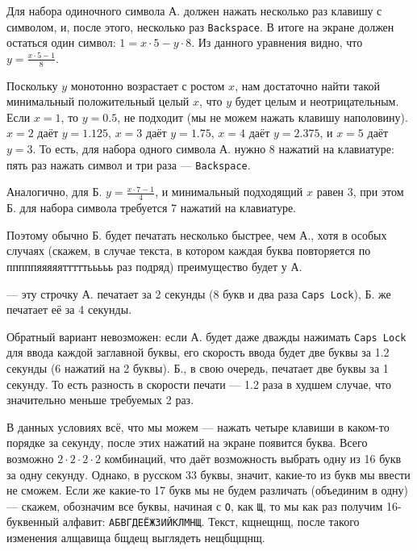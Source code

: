 \begin{itemize}
\itA Для набора одиночного символа А. должен нажать несколько раз клавишу с символом, 
и, после этого, несколько раз \verb!Backspace!. В итоге на экране должен остаться один
символ: $1 = x \cdot 5 - y \cdot 8$. Из данного уравнения видно, что
$y = \frac{x \cdot 5 - 1}{8}$.

Поскольку $y$ монотонно возрастает с ростом $x$, нам достаточно найти такой минимальный 
положительный целый $x$, что $y$ будет целым и неотрицательным. Если $x=1$, то $y = 0.5$, 
не подходит (мы не можем нажать клавишу наполовину). $x=2$ даёт $y = 1.125$, $x=3$ даёт $y = 1.75$, $x=4$ даёт $y = 2.375$,
и $x=5$ даёт $y=3$. То есть, для набора одного символа А. нужно 8 нажатий на клавиатуре:
пять раз нажать символ и три раза --- \verb!Backspace!.

Аналогично, для Б. $y = \frac{x \cdot 7 - 1}{4}$, и минимальный подходящий $x$ равен 3, при этом
Б. для набора символа требуется 7 нажатий на клавиатуре.

Поэтому обычно Б. будет печатать несколько быстрее, чем А., хотя в особых случаях (скажем,
в случае текста, в котором каждая буква повторяется по пппппяяяяятттттььььь раз подряд)
преимущество будет у А.

 --- эту строчку А. печатает за 2 секунды (8 букв и два раза \verb!Caps Lock!), 
Б. же печатает её за 4 секунды.

Обратный вариант невозможен: если А. будет даже дважды нажимать \verb!Caps Lock! для ввода 
каждой заглавной буквы, его скорость ввода будет две буквы за 1.2 секунды (6 нажатий на 2 буквы). 
Б., в свою очередь, печатает две буквы за 1 секунду. То есть разность в скорости печати --- 1.2 раза
в худшем случае, что значительно меньше требуемых 2 раз.

\itC В данных условиях всё, что мы можем --- нажать четыре клавиши в каком-то порядке за секунду,
после этих нажатий на экране появится буква. 
Всего возможно $2\cdot 2 \cdot 2 \cdot 2$ комбинаций, что даёт 
возможность выбрать одну из 16 букв за одну секунду. 
Однако, в русском 33 буквы, значит, какие-то из букв мы ввести не сможем. Если же какие-то 17
букв мы не будем различать (объединим в одну) --- скажем, обозначим все буквы, начиная с {\texttt{О}},
как {\texttt{Щ}}, то мы как раз получим 16-буквенный алфавит: {\texttt{АБВГДЕЁЖЗИЙКЛМНЩ}}. 
Текст, кщнещнщ, после такого изменения алщавища бщдещ выглядеть нещбщщнщ.
\end{itemize}
